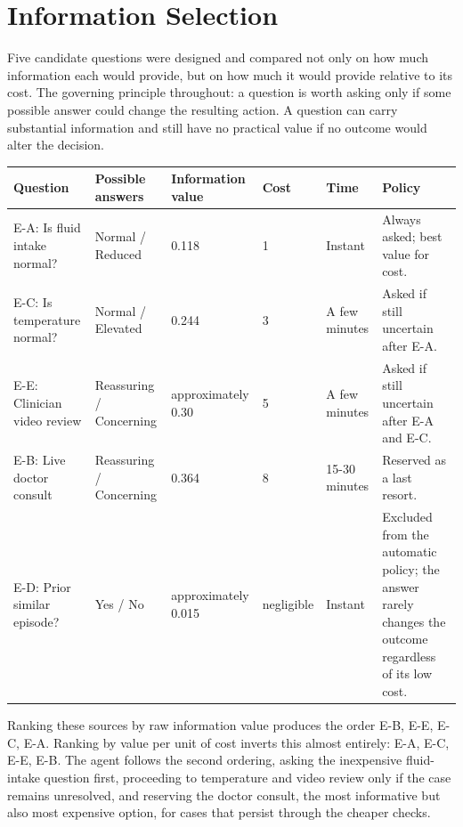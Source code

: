 \documentclass{article}
\begin{document}
\hypertarget{information-selection}{%
\section{Information Selection}\label{information-selection}}

Five candidate questions were designed and compared not only on how much
information each would provide, but on how much it would provide
relative to its cost. The governing principle throughout: a question is
worth asking only if some possible answer could change the resulting
action. A question can carry substantial information and still have no
practical value if no outcome would alter the decision.

\begin{table}[t]
\centering\small
\begin{tabular}{@{}p{}p{}p{}p{}p{}p{}@{}}
\toprule
\textbf{Question} & \textbf{Possible answers} & \textbf{Information value} & \textbf{Cost} & \textbf{Time} & \textbf{Policy} \\
\midrule
E-A: Is fluid intake normal? & Normal / Reduced & 0.118 & 1 & Instant & Always asked; best value for cost. \\
E-C: Is temperature normal? & Normal / Elevated & 0.244 & 3 & A few minutes & Asked if still uncertain after E-A. \\
E-E: Clinician video review & Reassuring / Concerning & approximately 0.30 & 5 & A few minutes & Asked if still uncertain after E-A and E-C. \\
E-B: Live doctor consult & Reassuring / Concerning & 0.364 & 8 & 15-30 minutes & Reserved as a last resort. \\
E-D: Prior similar episode? & Yes / No & approximately 0.015 & negligible & Instant & Excluded from the automatic policy; the answer rarely changes the outcome regardless of its low cost. \\
\bottomrule
\end{tabular}
\end{table}

Ranking these sources by raw information value produces the order E-B,
E-E, E-C, E-A. Ranking by value per unit of cost inverts this almost
entirely: E-A, E-C, E-E, E-B. The agent follows the second ordering,
asking the inexpensive fluid-intake question first, proceeding to
temperature and video review only if the case remains unresolved, and
reserving the doctor consult, the most informative but also most
expensive option, for cases that persist through the cheaper checks.
\end{document}
